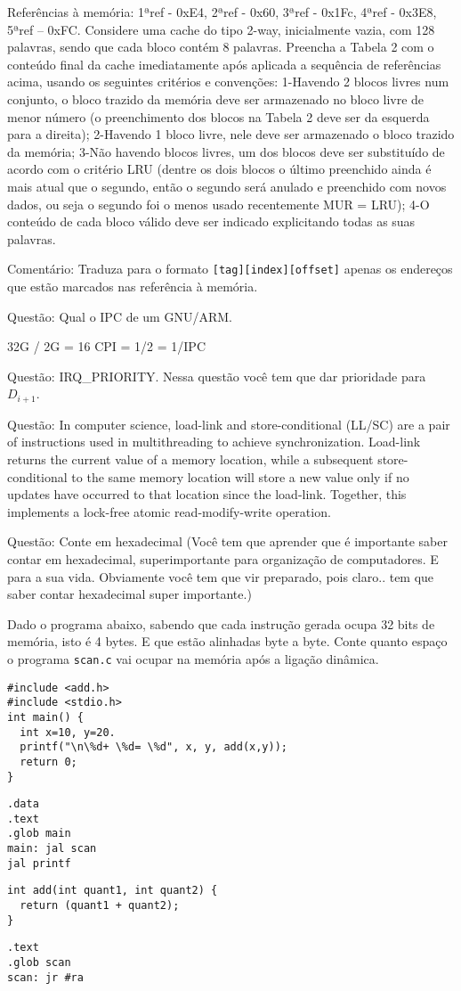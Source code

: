 \documentclass{article}
\begin{document}
Referências à memória: 1ªref - 0xE4, 2ªref - 0x60, 3ªref - 0x1Fc, 4ªref - 0x3E8,
5ªref – 0xFC. Considere uma cache do tipo 2-way, inicialmente vazia, com 128
palavras, sendo que cada bloco contém 8 palavras. Preencha a Tabela 2 com o
conteúdo final da cache imediatamente após aplicada a sequência de referências
acima, usando os seguintes critérios e convenções: 1-Havendo 2 blocos livres num
conjunto, o bloco trazido da memória deve ser armazenado no bloco livre de menor
número (o preenchimento dos blocos na Tabela 2 deve ser da esquerda para a
direita); 2-Havendo 1 bloco livre, nele deve ser armazenado o bloco trazido da
memória; 3-Não havendo blocos livres, um dos blocos deve ser substituído de
acordo com o critério LRU (dentre os dois blocos o último preenchido ainda é
mais atual que o segundo, então o segundo será anulado e preenchido com novos
dados, ou seja o segundo foi o menos usado recentemente MUR = LRU); 4-O conteúdo
de cada bloco válido deve ser indicado explicitando todas as suas palavras.

Comentário: Traduza para o formato \verb|[tag][index][offset]| apenas os
endereços que estão marcados nas referência à memória.

Questão: Qual o IPC de um GNU/ARM.

32G / 2G = 16
CPI = 1/2 = 1/IPC

Questão: IRQ\_PRIORITY. Nessa questão você tem que dar prioridade para
$D_{i+1}$.

Questão: In computer science, load-link and store-conditional (LL/SC) are a
pair of instructions used in multithreading to achieve synchronization.
Load-link returns the current value of a memory location, while a subsequent
store-conditional to the same memory location will store a new value only if no
updates have occurred to that location since the load-link. Together, this
implements a lock-free atomic read-modify-write operation.

Questão: Conte em hexadecimal (Você tem que aprender que é importante saber
contar em hexadecimal, superimportante para organização de computadores. E para
a sua vida. Obviamente você tem que vir preparado, pois claro.. tem que saber
contar hexadecimal super importante.)

Dado o programa abaixo, sabendo que cada instrução gerada ocupa 32 bits de
memória, isto é 4 bytes. E que estão alinhadas byte a byte. Conte quanto espaço
o programa \verb|scan.c| vai ocupar na memória após a ligação dinâmica.

\begin{verbatim}
#include <add.h>
#include <stdio.h>
int main() {
  int x=10, y=20.
  printf("\n\%d+ \%d= \%d", x, y, add(x,y));
  return 0;
}
\end{verbatim}

\begin{verbatim}
.data
.text
.glob main
main: jal scan
jal printf
\end{verbatim}

\begin{verbatim}
int add(int quant1, int quant2) {
  return (quant1 + quant2);
}
\end{verbatim}

\begin{verbatim}
.text
.glob scan
scan: jr #ra
\end{verbatim}
\end{document}
